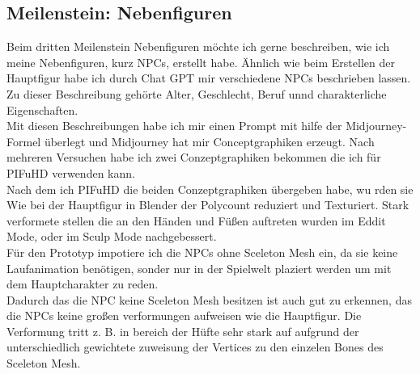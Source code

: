 \documentclass[10pt,a4paper,bibliography=totocnumbered,listof=totocnumbered]{scrartcl}
\begin{document}
\subsection {Meilenstein: Nebenfiguren}
Beim dritten Meilenstein Nebenfiguren möchte ich gerne beschreiben, wie ich meine Nebenfiguren, kurz NPCs, erstellt habe. Ähnlich wie beim Erstellen der Hauptfigur habe ich durch Chat GPT mir verschiedene NPCs beschrieben lassen. Zu dieser Beschreibung gehörte Alter, Geschlecht, Beruf unnd charakterliche Eigenschaften.
\\
Mit diesen Beschreibungen habe ich mir einen Prompt mit hilfe der Midjourney-Formel überlegt und Midjourney hat mir Conceptgraphiken erzeugt. Nach mehreren Versuchen habe ich zwei Conzeptgraphiken bekommen die ich für PIFuHD verwenden kann.
\\
Nach dem ich PIFuHD die beiden Conzeptgraphiken übergeben habe, wu rden sie Wie bei der Hauptfigur in Blender der Polycount reduziert und Texturiert.  Stark verformete stellen die an den Händen und Füßen auftreten wurden im Eddit Mode, oder im Sculp Mode nachgebessert.
\\
Für den Prototyp impotiere ich die NPCs ohne Sceleton Mesh ein, da sie keine Laufanimation benötigen, sonder nur in der Spielwelt plaziert werden um mit dem Hauptcharakter zu reden.
\\
Dadurch das die NPC keine Sceleton Mesh besitzen ist auch gut zu erkennen, das die NPCs keine großen verformungen aufweisen wie die Hauptfigur. Die Verformung tritt z. B. in bereich der Hüfte sehr stark auf aufgrund der unterschiedlich gewichtete zuweisung der Vertices zu den einzelen Bones des Sceleton Mesh.
\end{document}
